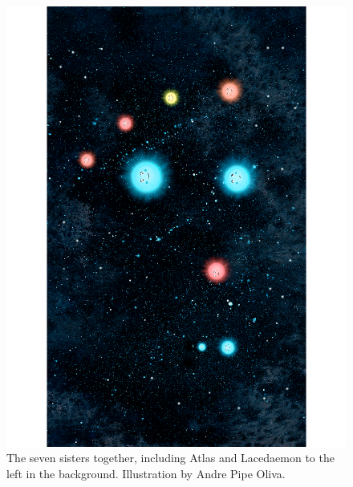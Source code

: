 \documentclass[main.tex]{subfiles}
\begin{document}
\begin{figure}
\includegraphics[width=\columnwidth,angle=270,origin=c]{ch1_3.pdf}
\caption{The seven sisters together, including Atlas and Lacedaemon to the left in the background.  Illustration by Andre Pipe Oliva.
\label{fig:fig3}}
\end{figure}
\end{document}

